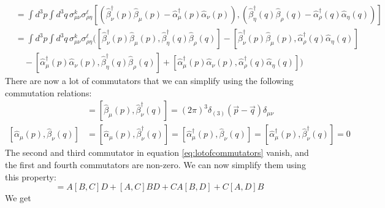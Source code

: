 \begin{align*}
[\hat{Q}_k, \hat{Q}_\ell] &= \int d^3 p \int d^3 q \, \sigma^k_{\mu\nu} \sigma^\ell_{\rho\eta} \left[ \left( \hat{\beta}_\nu^\dagger (p) \hat{\beta}_\mu (p) - \hat{\alpha}_\mu^\dagger (p) \hat{\alpha}_\nu (p) \right), \left( \hat{\beta}_\eta^\dagger (q) \hat{\beta}_\rho (q) - \hat{\alpha}_\rho^\dagger (q) \hat{\alpha}_\eta (q) \right) \right]\\
   &=\int d^3 p \int d^3 q \, \sigma^k_{\mu\nu} \sigma^\ell_{\rho\eta} \bigg( \left[ \hat{\beta}_\nu^\dagger (p) \hat{\beta}_\mu (p), \hat{\beta}_\eta^\dagger (q) \hat{\beta}_\rho (q) \right] - \left[ \hat{\beta}_\nu^\dagger (p) \hat{\beta}_\mu (p), \hat{\alpha}_\rho^\dagger (q) \hat{\alpha}_\eta (q) \right] \\
    &\quad - \left[ \hat{\alpha}_\mu^\dagger (p) \hat{\alpha}_\nu (p), \hat{\beta}_\eta^\dagger (q) \hat{\beta}_\rho (q) \right] + \left[ \hat{\alpha}_\mu^\dagger (p) \hat{\alpha}_\nu (p), \hat{\alpha}_\rho^\dagger (q) \hat{\alpha}_\eta (q) \right] \bigg)
    \label{eq:lotofcommutators}
\end{align*}
There are now a lot of commutators that we can simplify using the following commutation relations:
\begin{align}
[\hat{\alpha}_\mu (p), \hat{\alpha}_\nu^\dagger (q)] &= [\hat{\beta}_\mu (p), \hat{\beta}_\nu^\dagger (q)] = (2\pi)^3 \delta_{(3)}(\vec{p}-\vec{q}) \delta_{\mu\nu} \\
[\hat{\alpha}_\mu (p), \hat{\beta}_\nu (q)] &= [\hat{\alpha}_\mu (p), \hat{\beta}_\nu^\dagger (q)] = [\hat{\alpha}_\mu^\dagger (p), \hat{\beta}_\nu (q)] = [\hat{\alpha}_\mu^\dagger (p), \hat{\beta}_\nu^\dagger (q)] = 0
\end{align}
The second and third commutator in equation \eqref{eq:lotofcommutators} vanish, and the first and fourth commutators are non-zero. We can now simplify them using this property:
\begin{equation*}
    [AB, CD] =A[B, C]D + [A, C]BD + CA[B, D] + C[A, D]B 
\end{equation*}
We get

